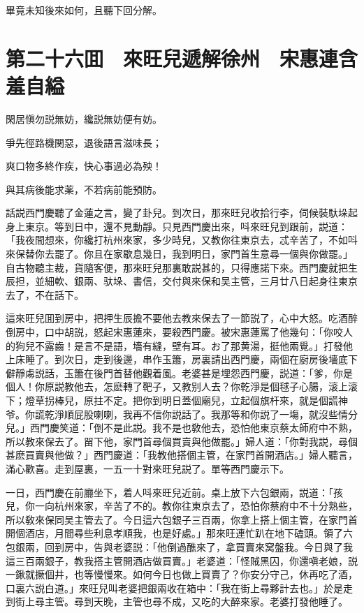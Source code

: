 畢竟未知後來如何，且聽下回分解。

\chapter*{第二十六囬　來旺兒遞解徐州　宋惠連含羞自縊}

閑居愼勿説無妨，纔説無妨便有妨。

爭先徑路機関惡，退後語言滋味長；

爽口物多終作疾，快心事過必為殃！

與其病後能求薬，不若病前能預防。

話説西門慶聽了金蓮之言，變了卦兒。到次日，那來旺兒收拾行李，伺候裝馱垛起身上東京。等到日中，還不見動靜。只見西門慶出來，呌來旺兒到跟前，説道：「我夜間想來，你纔打杭州來家，多少時兒，又教你往東京去，忒辛苦了，不如呌來保替你去罷了。你且在家歇息幾日，我到明日，家門首生意尋一個與你做罷。」自古物聽主裁，貨隨客便，那來旺兒那裏敢説甚的，只得應諾下來。西門慶就把生辰担，並細軟、銀兩、驮垛、書信，交付與來保和吴主管，三月廿八日起身往東京去了，不在話下。

這來旺兒囬到房中，把押生辰擔不要他去教來保去了一節説了，心中大怒。吃酒醉倒房中，口中胡説，怒起宋惠蓮來，要殺西門慶。被宋惠蓮罵了他幾句：「你咬人的狗兒不露齒！是言不是語，墻有縫，壁有耳。お了那黄湯，挺他兩覺。」打發他上床睡了。到次日，走到後邊，串作玉簫，房裏請出西門慶，兩個在廚房後墻底下僻靜䖏説話，玉簫在後門首替他觀着風。老婆甚是埋怨西門慶，説道：「爹，你是個人！你原説教他去，怎麽轉了靶子，又教别人去？你乾淨是個毬子心腸，滚上滚下；燈草拐棒兒，原拄不定。把你到明日蓋個廟兒，立起個旗杆來，就是個謊神爷。你謊乾淨順屁股喇喇，我再不信你説話了。我那等和你説了一塲，就沒些情分兒。」西門慶笑道：「倒不是此説。我不是也敎他去，恐怕他東京蔡太師府中不熟，所以教來保去了。㽞下他，家門首尋個買賣與他做罷。」婦人道：「你對我説，尋個甚麽買賣與他做？」西門慶道：「我教他搭個主管，在家門首開酒店。」婦人聽言，滿心歡喜。走到屋裏，一五一十對來旺兒説了。單等西門慶示下。

一日，西門慶在前廳坐下，着人呌來旺兒近前。桌上放下六包銀兩，説道：「孩兒，你一向杭州來家，辛苦了不的。教你往東京去了，恐怕你蔡府中不十分熟些，所以敎來保同吴主管去了。今日這六包銀子三百兩，你拿上搭上個主管，在家門首開個酒店，月間尋些利息孝順我，也是好處。」那來旺連忙趴在地下磕頭。領了六包銀兩，回到房中，告與老婆説：「他倒過醮來了，拿買賣來窝盤我。今日與了我這三百兩銀子，教我搭主管開酒店做買賣。」老婆道：「怪賊黑囚，你還嗔老娘，説一鍬就撅個井，也等慢慢來。如何今日也做上買賣了？你安分守己，休再吃了酒，口裏六説白道。」來旺兒叫老婆把銀兩收在箱中：「我在街上尋夥計去也。」於是走到街上尋主管。尋到天晚，主管也尋不成，又吃的大醉來家。老婆打發他睡了。

